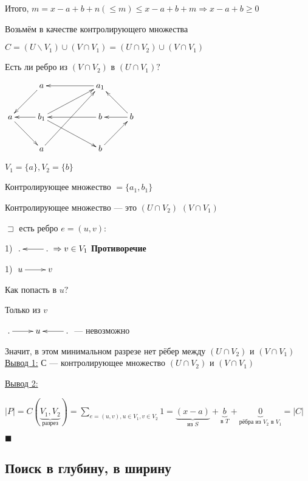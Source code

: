 \documentclass[a4paper, 12pt] {article}
\begin{document}
Итого, $ m = x-a+b+n(\le m) \le x-a+b+m \Rightarrow x-a+b \ge 0$

Возьмём в качестве контролирующего множества 

$ C = (U \backslash V_{1}) \cup (V \cap V_{1}) = (U \cap V_{2}) \cup (V \cap V_{1}) $

Есть ли ребро из $ (V \cap V_{2}) $ в $ (U \cap V_{1})? $

$\xymatrix{
	& 	a \ar@{<-}[rr]   & & a_{1} \\
	a  \ar@{->}[rd] \ar@{<-}[ru] \ar@{<-}[r] &	b_{1} \ar@{->}[rrd] \ar@{->}[rru] \ar@{<-}[rr] & & b \ar@{<-}[r] & b  \ar@{<-}[ld] \ar@{->}[lu] \\
	&	a \ar@{->}[rruu]   & & b \\
}$

$ V_{1} = \{a\}, V_{2} = \{b\} $

Контролирующее множество $ = \{a_{1}, b_{1}\}$

Контролирующее множество --- это $ (U \cap V_{2}) $  $ (V \cap V_{1}) $

$ \sqsupset $ есть ребро $ e = (u, v): $

1) $\xymatrix{
	. \ar@{<-}[r] & . \\
} \Rightarrow v \in V_{1}$ \textbf{Противоречие}

1) $\xymatrix{
	u \ar@{->}[r] & v \\
}$

 Как попасть в $ u? $ 
 
 Только из $ v $

$\xymatrix{
. \ar@{->}[r] &	u \ar@{<-}[r] & . \\
}$ --- невозможно

Значит, в этом минимальном разрезе нет рёбер между $ (U \cap V_{2}) $ и $ (V \cap V_{1}) $\\

\underline{Вывод 1:} $ С $ --- контролирующее множество $ (U \cap V_{2}) $ и $ (V \cap V_{1}) $

\underline{Вывод 2:} 

$ |P|=C(\underbrace{V_{1}, V_{2}}_{\text{разрез}})= \sum\limits_{e = (u, v), u \in V_{1}, v \in V_{2}} 1 = \underbrace{(x-a)}_{\text{из } S}+\underbrace{b}_{\text{в } T}+\underbrace{0}_{\text{рёбра из } V_{2} \text{ в } V_{1}}=|C|$

$ \blacksquare $

\newpage

\subsection{Поиск в глубину, в ширину}
\end{document}
